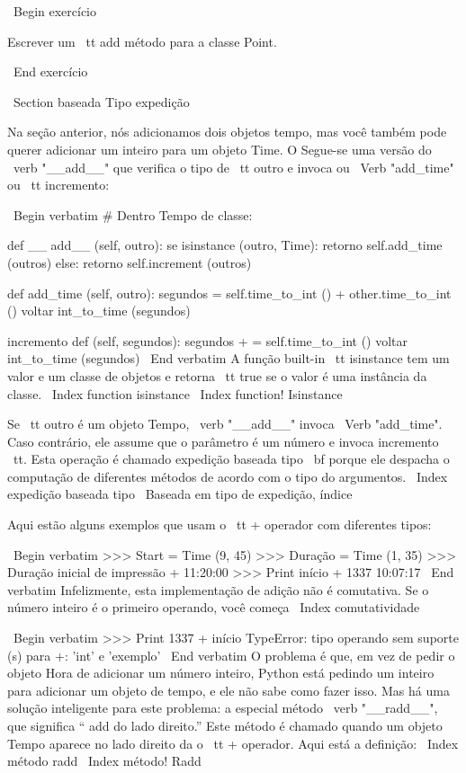 \documentclass[10pt]{book}
\begin{document}
{{{{{{{{{{{{{{\ Begin {} exercício

Escrever um {\ tt add} método para a classe Point.  

\ End {} exercício


\ Section {baseada Tipo expedição}

Na seção anterior, nós adicionamos dois objetos tempo, mas você
também pode querer adicionar um inteiro para um objeto Time. O
Segue-se uma versão do \ verb "__add__"
que verifica o tipo de {\ tt outro} e invoca ou
\ Verb "add_time" ou {\ tt incremento}:

\ Begin {verbatim}
# Dentro Tempo de classe:

    def __ add__ (self, outro):
        se isinstance (outro, Time):
            retorno self.add_time (outros)
        else:
            retorno self.increment (outros)

    def add_time (self, outro):
        segundos = self.time_to_int () + other.time_to_int ()
        voltar int_to_time (segundos)

    incremento def (self, segundos):
        segundos + = self.time_to_int ()
        voltar int_to_time (segundos)
\ End {verbatim}
%
A função built-in {\ tt isinstance} tem um valor e um
classe de objetos e retorna {\ tt true} se o valor é uma instância
da classe.
\ Index {function isinstance}
\ Index {function! Isinstance}

Se {\ tt outro} é um objeto Tempo, \ verb "__add__" invoca
\ Verb "add_time". Caso contrário, ele assume que o parâmetro
é um número e invoca {incremento \ tt}. Esta operação é
chamado {expedição baseada tipo \ bf} porque ele despacha o
computação de diferentes métodos de acordo com o tipo do
argumentos.
\ Index {expedição baseada tipo}
\ {Baseada em tipo de expedição, índice}

Aqui estão alguns exemplos que usam o {\ tt +} operador com diferentes
tipos:

\ Begin {verbatim}
>>> Start = Time (9, 45)
>>> Duração = Time (1, 35)
>>> Duração inicial de impressão +
11:20:00
>>> Print início + 1337
10:07:17
\ End {verbatim}
%
Infelizmente, esta implementação de adição não é comutativa.
Se o número inteiro é o primeiro operando, você começa
\ Index {} comutatividade

\ Begin {verbatim}
>>> Print 1337 + início
TypeError: tipo operando sem suporte (s) para +: 'int' e 'exemplo'
\ End {verbatim}
%
O problema é que, em vez de pedir o objeto Hora de adicionar um número inteiro,
Python está pedindo um inteiro para adicionar um objeto de tempo, e ele não sabe
como fazer isso. Mas há uma solução inteligente para este problema: a
especial método \ verb "__radd__", que significa `` add do lado direito.''
Este método é chamado quando um objeto Tempo aparece no lado direito da
o {\ tt +} operador. Aqui está a definição:
\ Index {método radd}
\ Index {método! Radd}

}}}}}}}}}}}}}}
\end{document}
